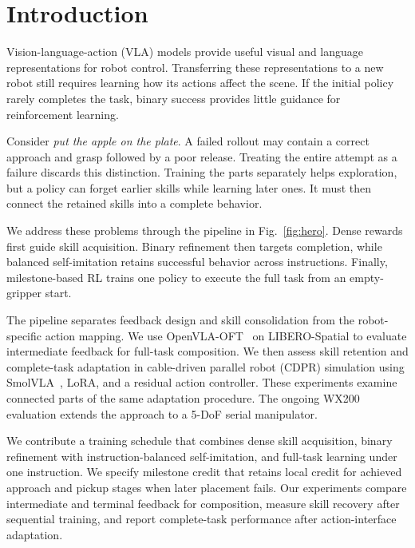\section{Introduction}\label{sec:introduction}
Vision-language-action (VLA) models provide useful visual and language representations for robot control. Transferring these representations to a new robot still requires learning how its actions affect the scene. If the initial policy rarely completes the task, binary success provides little guidance for reinforcement learning.

Consider \emph{put the apple on the plate}. A failed rollout may contain a correct approach and grasp followed by a poor release. Treating the entire attempt as a failure discards this distinction. Training the parts separately helps exploration, but a policy can forget earlier skills while learning later ones. It must then connect the retained skills into a complete behavior.

We address these problems through the pipeline in Fig.~\ref{fig:hero}. Dense rewards first guide skill acquisition. Binary refinement then targets completion, while balanced self-imitation retains successful behavior across instructions. Finally, milestone-based RL trains one policy to execute the full task from an empty-gripper start.

The pipeline separates feedback design and skill consolidation from the robot-specific action mapping. We use OpenVLA-OFT~\cite{openvlaoft} on LIBERO-Spatial to evaluate intermediate feedback for full-task composition. We then assess skill retention and complete-task adaptation in cable-driven parallel robot (CDPR) simulation using SmolVLA~\cite{smolvla}, LoRA, and a residual action controller. These experiments examine connected parts of the same adaptation procedure. The ongoing WX200 evaluation extends the approach to a 5-DoF serial manipulator.

We contribute a training schedule that combines dense skill acquisition, binary refinement with instruction-balanced self-imitation, and full-task learning under one instruction. We specify milestone credit that retains local credit for achieved approach and pickup stages when later placement fails. Our experiments compare intermediate and terminal feedback for composition, measure skill recovery after sequential training, and report complete-task performance after action-interface adaptation.
